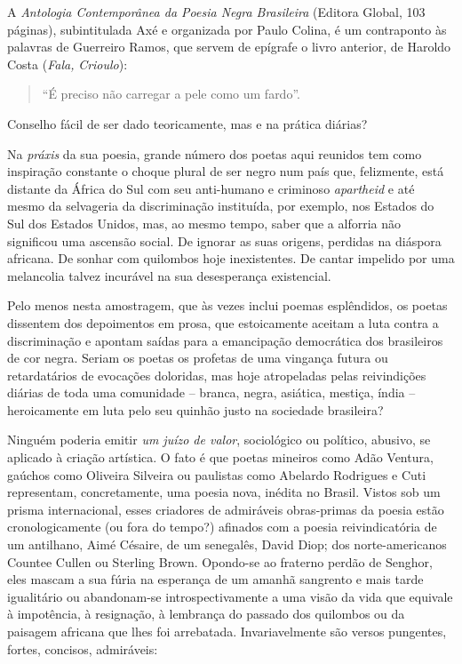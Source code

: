 \documentclass[
  letterpaper,
  DIV=11,
  numbers=noendperiod]{scrreprt}
\begin{document}
A \emph{Antologia Contemporânea da Poesia Negra Brasileira} (Editora
Global, 103 páginas), subintitulada Axé e organizada por Paulo Colina, é
um contraponto às palavras de Guerreiro Ramos, que servem de epígrafe o
livro anterior, de Haroldo Costa (\emph{Fala,} \emph{Crioulo}):

\begin{quote}
``É preciso não carregar a pele como um fardo''.
\end{quote}

Conselho fácil de ser dado teoricamente, mas e na prática diárias?

Na \emph{práxis} da sua poesia, grande número dos poetas aqui reunidos
tem como inspiração constante o choque plural de ser negro num país que,
felizmente, está distante da África do Sul com seu anti-humano e
criminoso \emph{apartheid} e até mesmo da selvageria da discriminação
instituída, por exemplo, nos Estados do Sul dos Estados Unidos, mas, ao
mesmo tempo, saber que a alforria não significou uma ascensão social. De
ignorar as suas origens, perdidas na diáspora africana. De sonhar com
quilombos hoje inexistentes. De cantar impelido por uma melancolia
talvez incurável na sua desesperança existencial.

Pelo menos nesta amostragem, que às vezes inclui poemas esplêndidos, os
poetas dissentem dos depoimentos em prosa, que estoicamente aceitam a
luta contra a discriminação e apontam saídas para a emancipação
democrática dos brasileiros de cor negra. Seriam os poetas os profetas
de uma vingança futura ou retardatários de evocações doloridas, mas hoje
atropeladas pelas reivindições diárias de toda uma comunidade -- branca,
negra, asiática, mestiça, índia -- heroicamente em luta pelo seu quinhão
justo na sociedade brasileira?

Ninguém poderia emitir \emph{um juízo de valor}, sociológico ou
político, abusivo, se aplicado à criação artística. O fato é que poetas
mineiros como Adão Ventura, gaúchos como Oliveira Silveira ou paulistas
como Abelardo Rodrigues e Cuti representam, concretamente, uma poesia
nova, inédita no Brasil. Vistos sob um prisma internacional, esses
criadores de admiráveis obras-primas da poesia estão cronologicamente
(ou fora do tempo?) afinados com a poesia reivindicatória de um
antilhano, Aimé Césaire, de um senegalês, David Diop; dos
norte-americanos Countee Cullen ou Sterling Brown. Opondo-se ao fraterno
perdão de Senghor, eles mascam a sua fúria na esperança de um amanhã
sangrento e mais tarde igualitário ou abandonam-se introspectivamente a
uma visão da vida que equivale à impotência, à resignação, à lembrança
do passado dos quilombos ou da paisagem africana que lhes foi
arrebatada. Invariavelmente são versos pungentes, fortes, concisos,
admiráveis:
\end{document}
